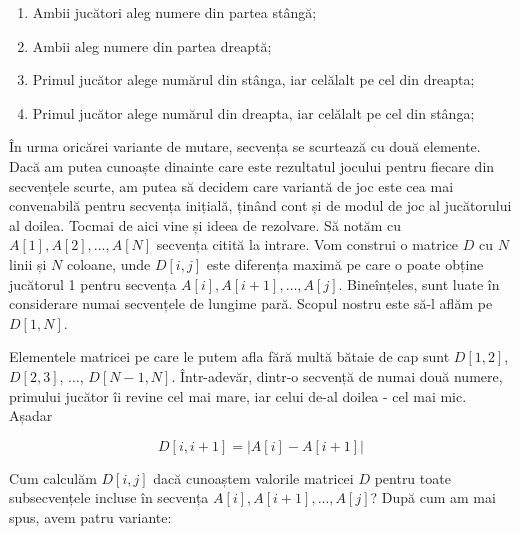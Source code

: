 \begin{enumerate}

\item Ambii jucători aleg numere din partea stângă;

\item Ambii aleg numere din partea dreaptă;

\item Primul jucător alege numărul din stânga, iar celălalt pe cel din
  dreapta;

\item Primul jucător alege numărul din dreapta, iar celălalt pe cel din
  stânga;

\end{enumerate}

În urma oricărei variante de mutare, secvența se scurtează cu două
elemente. Dacă am putea cunoaște dinainte care este rezultatul jocului pentru
fiecare din secvențele scurte, am putea să decidem care variantă de joc este
cea mai convenabilă pentru secvența inițială, ținând cont și de modul de joc
al jucătorului al doilea. Tocmai de aici vine și ideea de rezolvare. Să notăm
cu $A[1], A[2], ..., A[N]$ secvența citită la intrare. Vom construi o
matrice $D$ cu $N$ linii și $N$ coloane, unde $D[i,j]$ este diferența maximă
pe care o poate obține jucătorul 1 pentru secvența $A[i], A[i+1], \dots,
A[j]$. Bineînțeles, sunt luate în considerare numai secvențele de lungime
pară. Scopul nostru este să-l aflăm pe $D[1,N]$.

Elementele matricei pe care le putem afla fără multă bătaie de cap sunt
$D[1,2]$, $D[2,3]$, $\dots$, $D[N-1,N]$. Într-adevăr, dintr-o secvență de
numai două numere, primului jucător îi revine cel mai mare, iar celui de-al
doilea - cel mai mic. Așadar

\begin{equation}
  D[i,i + 1] = |A[i] - A[i + 1]|
\end{equation}

Cum calculăm $D[i,j]$ dacă cunoaștem valorile matricei $D$ pentru toate
subsecvențele incluse în secvența $A[i], A[i+1], ..., A[j]$? După cum am mai
spus, avem patru variante:

